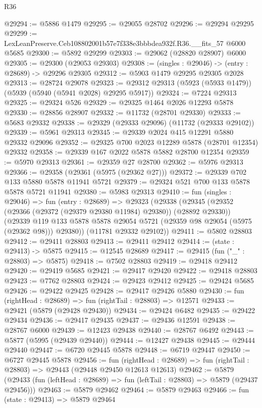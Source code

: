 \begin{lexlean}{R36}
\begin{coremodule}
@29294 := @5886 @1479
@29295 := @29055 @28702
@29296 := @29294 @29295
@29299 := LexLeanPreserve.Ceb108802001b57e7f338e3bbbdea932f.R36.__fits_57 @6000 @5685
@29300 := @5892 @29299
@29303 := @29062 (@28820 @28907) @6000
@29305 := @29300 (@29053 @29303)
@29308 := (singles : @29046) -> (entry : @28689) -> @29296 @29305
@29312 := @5903 @1479 @29295 @29305 @2028
@29313 := @28724 @29078
@29323 := @29312 @29313 (@5923 (@5933 @1479)) (@5939 (@5940 (@5941 @2028) @29295 @5917))
@29324 := @7224 @29313
@29325 := @29324 @526
@29329 := @29325 @1464 @2026 @12293 @5878
@29330 := @28856 @28907
@29332 := @11732 (@28701 @29330)
@29333 := @5683 @29332
@29338 := @29329 (@29333 @29096) (@11732 (@29333 @29102))
@29339 := @5961 @29313
@29345 := @29339 @2024 @415 @12291 @5880 @29332 @29096
@29352 := @29325 @700 @2023 @12289 @5878 (@28701 @12354) @29332
@29358 := @29339 @167 @2022 @5878 @5882 @28700 @12354
@29359 := @5970 @29313
@29361 := @29359 @27 @28700
@29362 := @5976 @29313
@29366 := @29358 (@29361 (@5975 (@29362 @27)))
@29372 := @29339 @702 @133 @5880 @5878 @11941 @5721
@29379 := @29324 @521 @700 @133 @5878 @5878 @5721 @11941
@29380 := @5983 @29313
@29410 := fun (singles : @29046) =>
  fun (entry : @28689) =>
  @29323
    (@29338
      (@29345
        (@29352 (@29366 (@29372 (@29379 @29380 @11984) @29380)) (@28892 @29330))
        (@29339 @119 @133 @5878 @5878 @29054 @5721 (@29359 @98 @29054 (@5975 (@29362 @98))) @29380))
      (@11781 @29332 @29102))
@29411 := @5802 @28803
@29412 := @29411 @28803
@29413 := @29411 @29412
@29414 := (state : @29413) -> @5875
@29415 := @12545 @28689
@29417 := @29415 (fun ("_" : @28803) => @5875)
@29418 := @7502 @28803
@29419 := @29418 @29412
@29420 := @29419 @5685
@29421 := @29417 @29420
@29422 := @29418 @28803
@29423 := @7762 @28803
@29424 := @29423 @29412
@29425 := @29424 @5685
@29426 := @29422 @29425
@29428 := @29417 @29426 @5880
@29430 := fun (rightHead : @28689) => fun (rightTail : @28803) => @12571
@29433 := @29421 (@5879 (@29428 @29430))
@29434 := @29424 @6482
@29435 := @29422 @29434
@29436 := @29417 @29435
@29437 := @29436 @12591
@29438 := @28767 @6000
@29439 := @12423 @29438
@29440 := @28767 @6492
@29443 := @5877 (@5995 (@29439 @29440))
@29444 := @12427 @29438
@29445 := @29444 @29440
@29447 := @6720 @29445 @5878
@29448 := @6719 @29447
@29450 := @6727 @29445 @5878
@29456 := fun (rightHead : @28689) =>
  fun (rightTail : @28803) => @29443 (@29448 @29450 @12613 @12613)
@29462 := @5879
    (@29433 (fun (leftHead : @28689) => fun (leftTail : @28803) => @5879 (@29437 @29456)))
@29463 := @5879 @29462
@29464 := @5879 @29463
@29466 := fun (state : @29413) => @5879 @29464

\end{coremodule}
\end{lexlean}
